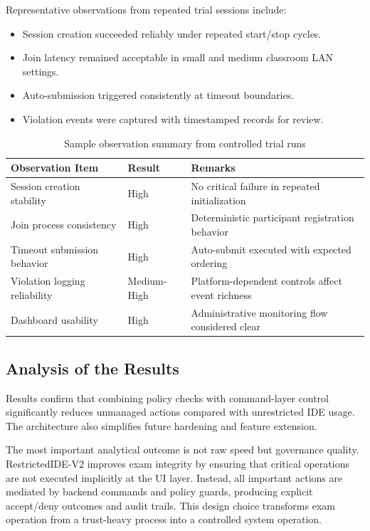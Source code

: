\documentclass[12pt,a4paper]{report}
\begin{document}
	Representative observations from repeated trial sessions include:
	\begin{itemize}
		\item Session creation succeeded reliably under repeated start/stop cycles.
		\item Join latency remained acceptable in small and medium classroom LAN settings.
		\item Auto-submission triggered consistently at timeout boundaries.
		\item Violation events were captured with timestamped records for review.
	\end{itemize}
	
	\begin{table}[htbp]
		\centering
		\caption{Sample observation summary from controlled trial runs}
		\begin{tabular}{|p{}|p{}|p{}|}
			\hline
			\textbf{Observation Item} & \textbf{Result} & \textbf{Remarks} \\
			\hline
			Session creation stability & High & No critical failure in repeated initialization \\
			\hline
			Join process consistency & High & Deterministic participant registration behavior \\
			\hline
			Timeout submission behavior & High & Auto-submit executed with expected ordering \\
			\hline
			Violation logging reliability & Medium-High & Platform-dependent controls affect event richness \\
			\hline
			Dashboard usability & High & Administrative monitoring flow considered clear \\
			\hline
		\end{tabular}
	\end{table}
	
	\subsection{Analysis of the Results}
	Results confirm that combining policy checks with command-layer control significantly reduces unmanaged actions compared with unrestricted IDE usage. The architecture also simplifies future hardening and feature extension.
	
	The most important analytical outcome is not raw speed but governance quality. RestrictedIDE-V2 improves exam integrity by ensuring that critical operations are not executed implicitly at the UI layer. Instead, all important actions are mediated by backend commands and policy guards, producing explicit accept/deny outcomes and audit trails. This design choice transforms exam operation from a trust-heavy process into a controlled system operation.
	
\end{document}
